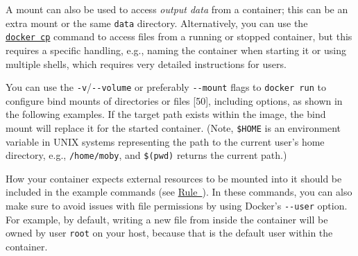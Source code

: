 \documentclass[10pt,letterpaper]{article}
\newenvironment{Shaded}{\begin{snugshade}}{\end{snugshade}}
\newcommand{\BuiltInTok}[1]{#1}
\newcommand{\CommentTok}[1]{\textcolor[rgb]{0.56,0.35,0.01}{\textit{#1}}}
\newcommand{\ExtensionTok}[1]{#1}
\newcommand{\NormalTok}[1]{#1}
\newcommand{\VariableTok}[1]{\textcolor[rgb]{0.00,0.00,0.00}{#1}}
\begin{document}
A mount can also be used to access \emph{output data} from a container;
this can be an extra mount or the same \texttt{data} directory.
Alternatively, you can use the
\href{https://docs.docker.com/engine/reference/commandline/cp/}{\texttt{docker\ cp}}
command to access files from a running or stopped container, but this
requires a specific handling, e.g., naming the container when starting
it or using multiple shells, which requires very detailed instructions
for users.

You can use the \texttt{-v}/\texttt{-\/-volume} or preferably
\texttt{-\/-mount} flags to \texttt{docker\ run} to configure bind
mounts of directories or files {[}50{]}, including options, as shown in
the following examples. If the target path exists within the image, the
bind mount will replace it for the started container. (Note,
\texttt{\$HOME} is an environment variable in UNIX systems representing
the path to the current user's home directory, e.g.,
\texttt{/home/moby}, and \texttt{\$(pwd)} returns the current path.)

\footnotesize

\begin{Shaded}
\end{Shaded}

\normalsize

How your container expects external resources to be mounted into it
should be included in the example commands (see
\hyperref[{rule:formatting}]{Rule~}). In
these commands, you can also make sure to avoid issues with file
permissions by using Docker's \texttt{-\/-user} option. For example, by
default, writing a new file from inside the container will be owned by
user \texttt{root} on your host, because that is the default user within
the container.
\end{document}
